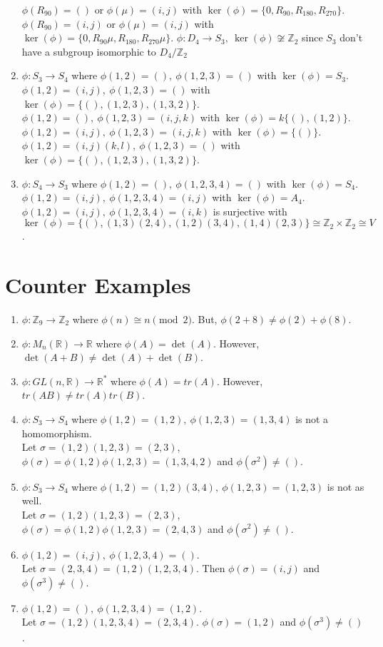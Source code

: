 \begin{enumerate}
		\subitem $\phi(R_{90}) =()$ or $\phi(\mu) =(i,j)$ with $\ker(\phi) = \{ 0,R_{90},R_{180},R_{270} \}$.
		\subitem $\phi(R_{90}) =(i,j)$ or $\phi(\mu) =(i,j)$ with $\ker(\phi) = \{ 0,R_{90}\mu,R_{180},R_{270}\mu \}$.
		\subitem $\phi : D_4 \to S_3,\ \ker(\phi) \not\cong \mathbb{Z}_2$ since $S_3$ don't have a subgroup isomorphic to $D_4/\mathbb{Z}_2$
	\item $\phi : S_3 \to S_4$ where
		\subitem $\phi(1,2)=(),\ \phi(1,2,3)= () $ with $\ker(\phi) = S_3$.
		\subitem $\phi(1,2)=(i,j),\ \phi(1,2,3)= () $ with $\ker(\phi) = \{ (),(1,2,3),(1,3,2) \}$.
		\subitem $\phi(1,2)=(),\ \phi(1,2,3)= (i,j,k) $ with $\ker(\phi) =k \{ (),(1,2) \} $.
		\subitem $\phi(1,2)=(i,j),\ \phi(1,2,3)= (i,j,k) $ with $\ker(\phi) = \{ () \} $.
		\subitem $\phi(1,2)=(i,j)(k,l),\ \phi(1,2,3)= () $ with $\ker(\phi) = \{(),(1,2,3),(1,3,2)\} $.
	\item $\phi : S_4 \to S_3$ where
		\subitem $\phi(1,2)=(),\ \phi(1,2,3,4)= () $ with $\ker(\phi) = S_4$.
		\subitem $\phi(1,2)=(i,j),\ \phi(1,2,3,4)= (i,j) $ with $\ker(\phi) = A_4$.
		\subitem $\phi(1,2)=(i,j),\ \phi(1,2,3,4)= (i,k) $ is surjective with \\$\ker(\phi) = \{ (), (1,3)(2,4), (1,2)(3,4), (1,4)(2,3) \} \cong \mathbb{Z}_2 \times \mathbb{Z}_2 \cong V$.
\end{enumerate}

\section{Counter Examples}
\begin{enumerate}
	\item $\phi : \mathbb{Z}_9 \to \mathbb{Z}_2$ where $\phi(n) \cong n \pmod{2}$. But, $\phi(2+8) \ne \phi(2)+\phi(8)$.
	\item $\phi : M_n(\mathbb{R}) \to \mathbb{R}$ where $\phi(A) = \det(A)$. However, $\det(A+B) \ne \det(A) + \det(B)$.
	\item $\phi : GL(n,\mathbb{R}) \to \mathbb{R}^\ast$ where $\phi(A) = tr(A)$. However, $tr(AB) \ne tr(A) tr(B)$.
	\item $\phi : S_3 \to S_4$ where $\phi(1,2)=(1,2),\ \phi(1,2,3)= (1,3,4)$ is not a homomorphism.\\ Let $\sigma = (1,2)(1,2,3) = (2,3)$, $\phi(\sigma) = \phi(1,2)\phi(1,2,3)=(1,3,4,2)$ and $\phi(\sigma^2) \ne ()$.
	\item $\phi : S_3 \to S_4$ where $\phi(1,2)=(1,2)(3,4),\ \phi(1,2,3)= (1,2,3)$ is not as well.\\ Let $\sigma = (1,2)(1,2,3) = (2,3)$, $\phi(\sigma) = \phi(1,2)\phi(1,2,3)=(2,4,3)$ and $\phi(\sigma^2) \ne ()$.
	\item $\phi(1,2)=(i,j),\ \phi(1,2,3,4)= () $.\\
	Let $\sigma = (2,3,4) = (1,2)(1,2,3,4)$. Then $\phi(\sigma)=(i,j)$ and $\phi(\sigma^3) \ne ()$.
	\item $\phi(1,2)=(),\ \phi(1,2,3,4)= (1,2)$.\\
	Let $\sigma = (1,2)(1,2,3,4) = (2,3,4)$. $\phi(\sigma) = (1,2)$ and $\phi(\sigma^3) \ne ()$.
\end{enumerate}

